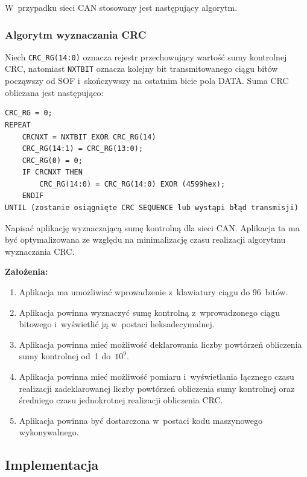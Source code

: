 \documentclass[12pt,a4paper]{article}
\begin{document}
W~przypadku sieci CAN stosowany jest następujący algorytm.

\subsubsection*{Algorytm wyznaczania CRC}

Niech \texttt{CRC\_RG(14:0)} oznacza rejestr przechowujący wartość sumy kontrolnej CRC,
natomiast \texttt{NXTBIT} oznacza kolejny bit transmitowanego ciągu bitów począwszy od
SOF i~skończywszy na ostatnim bicie pola DATA. Suma CRC obliczana jest następująco:

\begin{lstlisting}[language={},basicstyle=\ttfamily\small,numbers=none,frame=single,backgroundcolor=\color{codebg}]
CRC_RG = 0;
REPEAT
    CRCNXT = NXTBIT EXOR CRC_RG(14)
    CRC_RG(14:1) = CRC_RG(13:0);
    CRC_RG(0) = 0;
    IF CRCNXT THEN
        CRC_RG(14:0) = CRC_RG(14:0) EXOR (4599hex);
    ENDIF
UNTIL (zostanie osiągnięte CRC SEQUENCE lub wystąpi błąd transmisji)
\end{lstlisting}

Napisać aplikację wyznaczającą sumę kontrolną dla sieci CAN. Aplikacja ta ma być
optymalizowana ze względu na minimalizację czasu realizacji algorytmu wyznaczania CRC.

\textbf{Założenia:}
\begin{enumerate}[label=\alph*)]
    \item Aplikacja ma umożliwiać wprowadzenie z~klawiatury ciągu do 96~bitów.
    \item Aplikacja powinna wyznaczyć sumę kontrolną z~wprowadzonego ciągu
          bitowego i~wyświetlić ją w~postaci heksadecymalnej.
    \item Aplikacja powinna mieć możliwość deklarowania liczby powtórzeń obliczenia
          sumy kontrolnej od~1 do~$10^9$.
    \item Aplikacja powinna mieć możliwość pomiaru i~wyświetlania łącznego czasu
          realizacji zadeklarowanej liczby powtórzeń obliczenia sumy kontrolnej oraz
          średniego czasu jednokrotnej realizacji obliczenia CRC.
    \item Aplikacja powinna być dostarczona w~postaci kodu maszynowego wykonywalnego.
\end{enumerate}

\subsection*{Implementacja}
\end{document}
